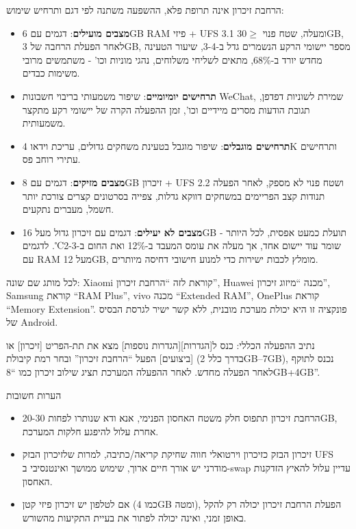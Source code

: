 
הרחבת זיכרון אינה תרופת פלא, ההשפעה משתנה לפי דגם ותרחיש שימוש:

\begin{itemize}
  \item \textbf{מצבים מועילים}: דגמים עם 6GB RAM פיזי + UFS 3.1 ומעלה, שטח פנוי $\geq$30GB, לאחר הפעלת הרחבה של 3GB, מספר יישומי הרקע הנשמרים גדל ב-3-4, שיעור הטעינה מחדש יורד ב-68\%, מתאים לשליחי משלוחים, נהגי מוניות וכו' - משתמשים מרובי משימות כבדים.
  \item \textbf{תרחישים יומיומיים}: שיפור משמעותי בריבוי חשבונות WeChat, שמירת לשוניות דפדפן, תגובת הודעות מסרים מיידיים וכו', זמן ההפעלה הקרה של יישומי רקע מתקצר משמעותית.
  \item \textbf{תרחישים מוגבלים}: שיפור מוגבל בטעינת משחקים גדולים, עריכת וידאו 4K ותרחישים עתירי רוחב פס.
  \item \textbf{מצבים מזיקים}: דגמים עם 8GB זיכרון + UFS 2.2 ושטח פנוי לא מספק, לאחר הפעלה תנודות קצב הפריימים במשחקים דווקא גדלות, צפייה בסרטונים קצרים צורכת יותר חשמל, מעברים נתקעים.
  \item \textbf{מצבים לא יעילים}: דגמים עם זיכרון גדול מעל 16GB - תועלת כמעט אפסית, לכל היותר שומר עוד יישום אחד, אך מעלה את עומס המעבד ב-12\% ואת החום ב-2-3℃. לדגמים עם RAM מעל 12GB, מומלץ לכבות ישירות כדי למנוע חישובי דחיסה מיותרים.
\end{itemize}


לכל מותג שם שונה: Xiaomi קוראת לזה “הרחבת זיכרון”, Huawei מכנה “מיזוג זיכרון”, Samsung קוראת “RAM Plus”, vivo מכנה “Extended RAM”, OnePlus קוראת “Memory Extension”. פונקציה זו היא יכולת מערכת מובנית, ללא קשר ישיר לגרסת הבסיס של Android.

נתיב ההפעלה הכללי: כנס ל[הגדרות][הגדרות נוספות] מצא את תת-הפריט [זיכרון] או [ביצועים] הפעל “הרחבת זיכרון” ובחר רמת קיבולת (בדרך כלל 2GB–7GB), נכנס לתוקף לאחר הפעלה מחדש. לאחר ההפעלה המערכת תציג שילוב זיכרון כמו “8GB+4GB”.

\begin{tcbwarn}{הערות חשובות}
\begin{itemize}
  \item הרחבת זיכרון תתפוס חלק משטח האחסון הפנימי, אנא ודא שנותרו לפחות 20-30GB, אחרת עלול להיפגע חלקות המערכת.
  \item זיכרון הבזק כזיכרון וירטואלי חווה שחיקת קריאה/כתיבה, למרות שלזיכרון הבזק UFS מודרני יש אורך חיים ארוך, שימוש ממושך ואינטנסיבי ב-swap עדיין עלול להאיץ הזדקנות האחסון.
  \item אם לטלפון יש זיכרון פיזי קטן (כמו 4GB ומטה), הפעלת הרחבת זיכרון יכולה רק להקל באופן זמני, ואינה יכולה לפתור את בעיית התקיעות מהשורש.
\end{itemize}

\end{tcbwarn}

